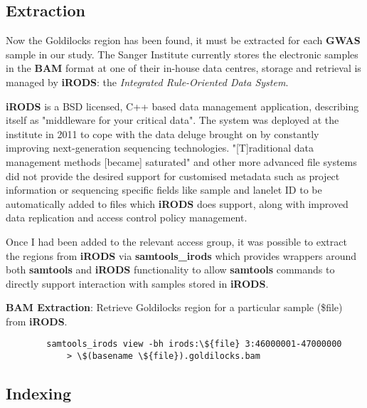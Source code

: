 \subsection{Extraction}

Now the Goldilocks region has been found, it must be extracted for each
\textbf{GWAS} sample in our study. The Sanger Institute currently stores the
electronic samples in the \textbf{BAM} format at one of their in-house data
centres, storage and retrieval is managed by \textbf{iRODS}\citep{irods}: the
\textit{Integrated Rule-Oriented Data System}.

\textbf{iRODS} is a BSD licensed, C++ based data management application,
describing itself as "middleware for your critical data"\citep{github:irods}.
The system was deployed at the institute in 2011 to cope with the data deluge
brought on by constantly improving next-generation sequencing technologies.
"[T]raditional data management methods [became] saturated" and other more
advanced file systems did not provide the desired support for customised metadata
such as project information or sequencing specific fields like sample and
lanelet ID to be automatically added to files\citep{irods-sanger} which
\textbf{iRODS} does support, along with improved data replication and access
control policy management.

Once I had been added to the relevant access group, it was possible to extract
the regions from \textbf{iRODS} via
\textbf{samtools\_irods}\citep{github:samtools-irods} which provides wrappers
around both \textbf{samtools} and \textbf{iRODS} functionality to allow
\textbf{samtools} commands to directly support interaction with samples stored
in \textbf{iRODS}.

\begin{listing}[H]
    \caption[bamext]{\textbf{BAM Extraction}: Retrieve Goldilocks region for
        a particular sample (\$file) from \textbf{iRODS}.}
    \label{list:bamext}
    \begin{verbatim}
        samtools_irods view -bh irods:\${file} 3:46000001-47000000
            > \$(basename \${file}).goldilocks.bam
    \end{verbatim}
\end{listing}


\subsection{Indexing}

